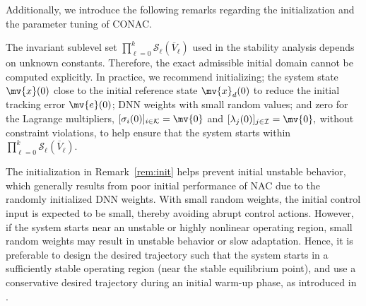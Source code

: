 \documentclass[letterpaper, journal]{IEEEtran}
\begin{document}

Additionally, we introduce the following remarks regarding the initialization and the parameter tuning of CONAC.

\begin{remark} \label{rem:init}
  The invariant sublevel set 
  $
    \prod_{\ell=0}^k \mathcal{S}_\ell(\overline V_\ell)
  $ 
  used in the stability analysis depends on unknown constants.
  Therefore, the exact admissible initial domain cannot be computed explicitly.
  In practice, we recommend initializing; the system state $\mv{x}(0)$ close to the initial reference state $\mv{x}_d(0)$ to reduce the initial tracking error $\mv{e}(0)$; DNN weights with small random values; and zero for the Lagrange multipliers, $[\sigma_i(0)]_{i\in\mathcal{K}}=\mv{0}$ and $[\lambda_j(0)]_{j\in\mathcal{I}}=\mv{0},$ without constraint violations, to help ensure that the system starts within
  $
    \prod_{\ell=0}^k \mathcal{S}_\ell(\overline V_\ell)
    .
  $
\end{remark}

\begin{remark} \label{rem:ref}  
  The initialization in Remark~\ref{rem:init} helps prevent initial unstable behavior, which generally results from poor initial performance of NAC due to the randomly initialized DNN weights.
  With small random weights, the initial control input is expected to be small, thereby avoiding abrupt control actions.
  However, if the system starts near an unstable or highly nonlinear operating region, small random weights may result in unstable behavior or slow adaptation.
  Hence, it is preferable to design the desired trajectory such that the system starts in a sufficiently stable operating region (\eg near the stable equilibrium point), and use a conservative desired trajectory during an initial warm-up phase, as introduced in \cite{Ryu:2025aa}.
\end{remark}
\end{document}
